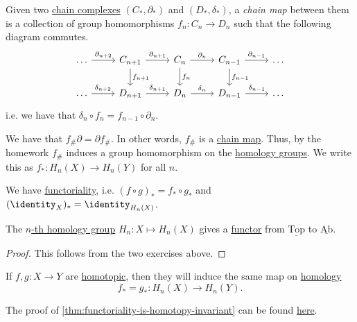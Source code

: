 \begin{definition}\label{def:chain-map}
	Given two \hyperref[def:chain-complex]{chain complexes} \((C_\ast, \partial_\ast)\) and \((D_\ast, \delta_\ast)\), a
	\emph{chain map} between them is a collection of group homomorphisms \(f_n \colon C_n \to D_n\) such that the following diagram commutes.
	\[
		\begin{tikzcd}
			\ldots & {C_{n+1}} & {C_n} & {C_{n-1}} & \ldots \\
			\ldots & {D_{n+1}} & {D_n} & {D_{n-1}} & \ldots
			\arrow["{\partial_{n+2}}", from=1-1, to=1-2]
			\arrow["{\delta_{n+2}}", from=2-1, to=2-2]
			\arrow["{\delta_{n+1}}", from=2-2, to=2-3]
			\arrow["{\delta_{n}}", from=2-3, to=2-4]
			\arrow["{\partial_{n-1}}", from=1-4, to=1-5]
			\arrow["{\partial_{n}}", from=1-3, to=1-4]
			\arrow["{\partial_{n+1}}", from=1-2, to=1-3]
			\arrow["{\delta_{n-1}}", from=2-4, to=2-5]
			\arrow["{f_{n-1}}", from=1-4, to=2-4]
			\arrow["{f_{n}}", from=1-3, to=2-3]
			\arrow["{f_{n+1}}", from=1-2, to=2-2]
		\end{tikzcd}
	\]
	i.e. we have that \(\delta_n \circ f_n = f_{n - 1} \circ \partial_n\).
\end{definition}

\begin{exercise}
	We have that \(f_{\#} \partial = \partial f_{\#}\). In other words, \(f_{\#}\) is a \hyperref[def:chain-map]{chain map}.
	Thus, by the homework \(f_{\#}\) induces a group homomorphism on the \hyperref[def:homology-group]{homology groups}. We write
	this as \(f_\ast \colon H_n(X) \to H_n(Y)\) for all \(n\).
\end{exercise}
\begin{exercise}
	We have \underline{functoriality}, i.e. \((f \circ g)_\ast = f_\ast \circ g_\ast\) and \((\identity_X)_\ast = \identity_{H_n(X)}\).
\end{exercise}

\begin{theorem}\label{thm:homology-group-defines-a-functor}
	The \hyperref[def:homology-group]{\(n\)-th homology group} \(H_n \colon X \mapsto H_n(X)\) gives a \hyperref[def:functor]{functor} from \(\underline{\mathrm{Top}}\)
	to \(\underline{\mathrm{Ab} }\).
\end{theorem}
\begin{proof}
	This follows from the two exercises above.
\end{proof}

\begin{theorem}\label{thm:functoriality-is-homotopy-invariant}
	If \(f, g\colon X \to Y\) are \hyperref[def:homotopic]{homotopic}, then they will induce the same map on \hyperref[def:homology-group]{homology}
	\[
		f_\ast = g_\ast \colon H_n(X) \to H_n(Y).
	\]
\end{theorem}
The proof of \autoref{thm:functoriality-is-homotopy-invariant} can be found \hyperref[pf:functoriality-is-homotopy-invariant]{here}.

